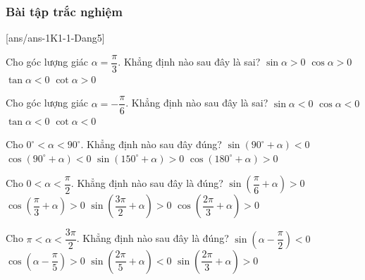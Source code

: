 \subsubsection{Bài tập trắc nghiệm}
[ans/ans-1K1-1-Dang5]
\begin{ex}%
	Cho góc lượng giác $\alpha=\dfrac{\pi}{3}$. Khẳng định nào sau đây là sai?
	\choice
	{$\sin\alpha>0$}
	{$\cos\alpha>0$}
	{\True $\tan\alpha<0$}
	{$\cot\alpha>0$}
\end{ex}
\begin{ex}%
	Cho góc lượng giác $\alpha=-\dfrac{\pi}{6}$. Khẳng định nào sau đây là sai?
	\choice
	{$\sin\alpha<0$}
	{\True $\cos\alpha<0$}
	{$\tan\alpha<0$}
	{$\cot\alpha<0$}
\end{ex}
\begin{ex}%
	Cho $0^{\circ}<\alpha<90^{\circ}$. Khẳng định nào sau đây đúng?
	\choice
	{$\sin\left(90^{\circ}+\alpha \right)<0$}
	{\True $\cos\left(90^{\circ}+\alpha \right)<0$}
	{$\sin\left(150^{\circ}+\alpha \right)>0$}
	{$\cos\left(180^{\circ}+\alpha \right)>0$}
\end{ex}
\begin{ex}%
	Cho $0<\alpha<\dfrac{\pi}{2}$. Khẳng định nào sau đây là đúng?
	\choice
	{\True $\sin\left(\dfrac{\pi}{6}+\alpha\right)>0$}
	{$\cos\left(\dfrac{\pi}{3}+\alpha\right)>0$}
	{$\sin\left(\dfrac{3\pi}{2}+\alpha\right)>0$}
	{$\cos\left(\dfrac{2\pi}{3}+\alpha\right)>0$}
\end{ex}
\begin{ex}%
	Cho $\pi<\alpha<\dfrac{3\pi}{2}$. Khẳng định nào sau đây là đúng?
	\choice
	{$\sin\left(\alpha-\dfrac{\pi}{2}\right)<0$}
	{$\cos\left(\alpha-\dfrac{\pi}{5}\right)>0$}
	{\True $\sin\left(\dfrac{2\pi}{5}+\alpha\right)<0$}
	{$\sin\left(\dfrac{2\pi}{3}+\alpha\right)>0$}
\end{ex}
